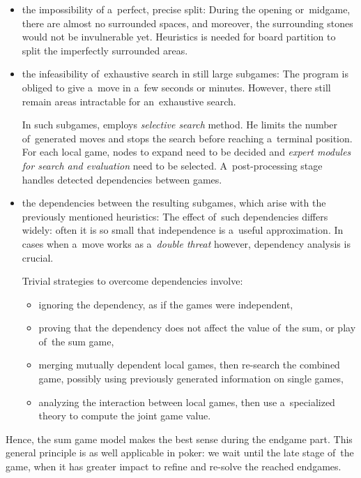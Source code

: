 \begin{itemize}[-]
  \item the impossibility of a~perfect, precise split:
    During the opening or~midgame, there are almost no surrounded spaces, and moreover, the surrounding stones would not be invulnerable yet.
    Heuristics is needed for board partition to split the imperfectly surrounded areas.

  \item the infeasibility of~exhaustive search in still large subgames:
    The program is obliged to give a~move in a~few seconds or minutes.
    However, there still remain areas intractable for an~exhaustive search.

    In such subgames, \Mueller{} employs \emph{selective search} method.
    He limits the number of~generated moves and stops the search before reaching a~terminal position.
    For each local game, nodes to expand need to be decided and \emph{expert modules for search and evaluation} need to be selected.
    A~post-processing stage handles detected dependencies between games.

  \item the dependencies between the resulting subgames, which arise with the previously mentioned heuristics:
    The effect of~such dependencies differs widely:
    often it is so small that independence is a~useful approximation.
    In cases when a~move works as a~\emph{double threat} however, dependency analysis is crucial.

    Trivial strategies to overcome dependencies involve:
    \begin{itemize}
      \item ignoring the dependency, as if the games were independent,
      \item proving that the dependency does not affect the value of~the sum, or play of~the sum game,
      \item merging mutually dependent local games, then re-search the combined game, possibly using previously generated information on single games,
      \item analyzing the interaction between local games, then use a~specialized theory to compute the joint game value.
    \end{itemize}
\end{itemize}

Hence, the sum game model makes the best sense during the endgame part.
This general principle is as well applicable in poker:
we wait until the late stage of~the game, when it has greater impact to refine and re-solve the reached endgames.

